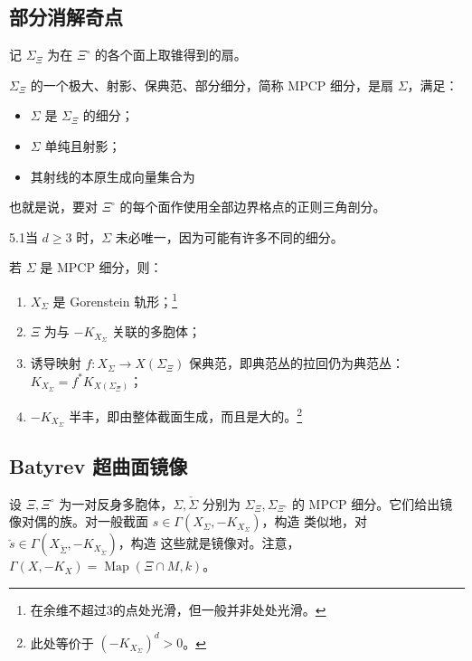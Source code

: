 \subsection{部分消解奇点}
记 $\Sigma_\Xi$ 为在 $\Xi^\circ$ 的各个面上取锥得到的扇。
\begin{definition}\label{def:5.3}
$\Sigma_\Xi$ 的一个极大、射影、保典范、部分细分，简称 MPCP 细分，是扇 $\Sigma$，满足：
\begin{itemize}
\item $\Sigma$ 是 $\Sigma_\Xi$ 的细分；
\item $\Sigma$ 单纯且射影；
\item 其射线的本原生成向量集合为
\end{itemize}
也就是说，要对 $\Xi^\circ$ 的每个面作使用全部边界格点的正则三角剖分。
\end{definition}
\begin{Note}{5.1}当 $d\ge3$ 时，$\Sigma$ 未必唯一，因为可能有许多不同的细分。\end{Note}
\begin{proposition}\label{prop:5.2}
若 $\Sigma$ 是 MPCP 细分，则：
\begin{enumerate}[label=(\roman*)]
\item $X_\Sigma$ 是 Gorenstein 轨形；\footnote{在余维不超过3的点处光滑，但一般并非处处光滑。}
\item $\Xi$ 为与 $-K_{X_\Sigma}$ 关联的多胞体；
\item 诱导映射 $f:X_\Sigma\to X(\Sigma_\Xi)$ 保典范，即典范丛的拉回仍为典范丛：$K_{X_\Sigma}=f^*K_{X(\Sigma_\Xi)}$；
\item $-K_{X_\Sigma}$ 半丰，即由整体截面生成，而且是大的。\footnote{此处等价于 $(-K_{X_\Sigma})^d>0$。}
\end{enumerate}
\end{proposition}
\subsection{Batyrev 超曲面镜像}
设 $\Xi,\Xi^\circ$ 为一对反身多胞体，$\Sigma,\check\Sigma$ 分别为 $\Sigma_\Xi,\Sigma_{\Xi^\circ}$ 的 MPCP 细分。它们给出镜像对偶的族。对一般截面 $s\in\Gamma(X_\Sigma,-K_{X_\Sigma})$，构造
类似地，对 $\check s\in\Gamma(X_{\check\Sigma},-K_{X_{\check\Sigma}})$，构造
这些就是镜像对。注意，$\Gamma(X,-K_X)=\operatorname{Map}(\Xi\cap M,k)$。
